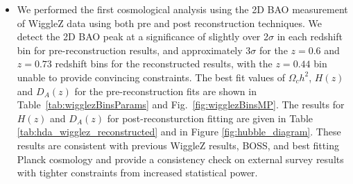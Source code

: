 \documentclass[iop,twocolappendix]{emulateapj}
\begin{document}
\begin{itemize}
	\item We performed the first cosmological analysis using the 2D BAO measurement of WiggleZ data using both pre and post reconstruction techniques. We detect the 2D BAO peak at a significance of slightly over 2$\sigma$ in each redshift bin for pre-reconstruction results, and approximately 3$\sigma$ for the $z=0.6$ and $z=0.73$ redshift bins for the reconstructed results, with the $z=0.44$ bin unable to provide convincing constraints. The best fit values of $\Omega_c h^2$, $H(z)$ and $D_A(z)$ for the pre-reconstruction fits are shown in Table~\ref{tab:wigglezBinsParams} and Fig.~\ref{fig:wigglezBinsMP}.  The results for $H(z)$ and $D_A(z)$ for post-reconsturction fitting are given in Table \ref{tab:hda_wigglez_reconstructed} and in Figure \ref{fig:hubble_diagram}. These results are consistent with previous WiggleZ results, BOSS, and best fitting Planck cosmology and provide a consistency check on external survey results with tighter constraints from increased statistical power.
\end{itemize}
\end{document}
